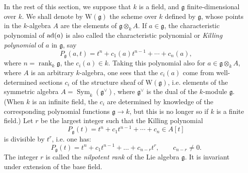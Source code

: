 In the rest of this section, we suppose that $k$ is a field, and
$\mathfrak g$ finite-dimensional over $k$. We shall denote by
$\mathrm W(\mathfrak g)$ the scheme over $k$ defined by $\mathfrak g$,
whose points in the $k$-algebra $A$ are the elements of
$\mathfrak g\otimes_k A$. If $a\in\mathfrak g$, the characteristic
polynomial of $\operatorname{ad}(a)$ is also called the characteristic polynomial
or \emph{Killing polynomial} of $a$ in $\mathfrak g$, say
\[
 P_{\mathfrak g}(a,t)=t^n+c_1(a)t^{n-1}+\cdots+c_n(a),
\]
where $n=\operatorname{rank}_k\mathfrak g$, the $c_i(a)\in k$. Taking
this polynomial also for $a\in\mathfrak g\otimes_k A$, where $A$ is an
arbitrary $k$-algebra, one sees that the $c_i(a)$ come from well-determined
sections $c_i$ of the structure sheaf of $\mathrm W(\mathfrak g)$, i.e.
elements of the symmetric algebra $A=\operatorname{Sym}_k(\mathfrak g^\vee)$,
where $\mathfrak g^\vee$ is the dual of the $k$-module $\mathfrak g$.
(When $k$ is an infinite field, the $c_i$ are determined by knowledge
of the corresponding polynomial functions $\mathfrak g\to k$, but
this is no longer so if $k$ is a finite field.) Let $r$ be the largest
integer such that the Killing polynomial
\[
 P_{\mathfrak g}(t)=t^n+c_1t^{n-1}+\cdots+c_n\in A[t]
\]
is divisible by $t^r$, i.e. one has:
\[
 P_{\mathfrak g}(t)=t^n+c_1t^{n-1}+\ldots+c_{n-r}t^r,
 \qquad c_{n-r}\ne0.
\]
The integer $r$ is called the \emph{nilpotent rank} of the Lie algebra
$\mathfrak g$. It is invariant under extension of the base field.

